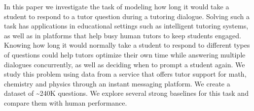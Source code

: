 In this paper we investigate the task of modeling how long it would take a student to respond to a tutor question during a tutoring dialogue. Solving such a task has applications in educational settings such as intelligent tutoring systems, as well as in platforms that help busy human tutors to keep students engaged. Knowing how long it would normally take a student to respond to different types of questions could help tutors optimize their own time while answering multiple dialogues concurrently, as well as deciding when to prompt a student again. We study this problem using data from a service that offers tutor support for math, chemistry and physics through an instant messaging platform. We create a dataset of {\textasciitilde}240K questions. We explore several strong baselines for this task and compare them with human performance.
